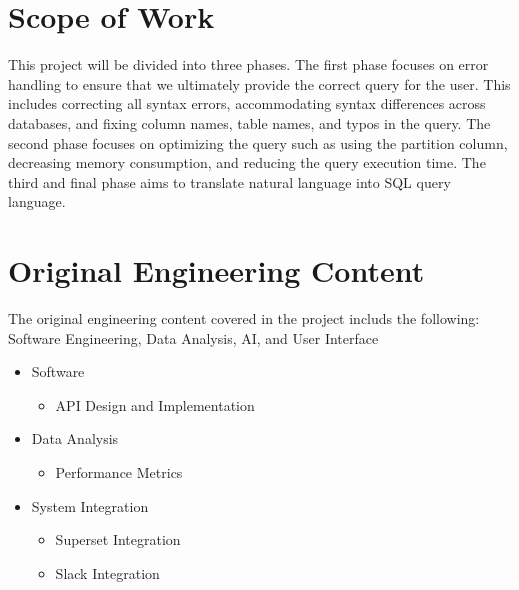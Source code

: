 \section{Scope of Work}
This project will be divided into three phases. The first phase focuses on error handling to ensure that we ultimately provide the correct query for the user. This includes correcting all syntax errors, accommodating syntax differences across databases, and fixing column names, table names, and typos in the query. The second phase focuses on optimizing the query such as using the partition column, decreasing memory consumption, and reducing the query execution time. The third and final phase aims to translate natural language into SQL query language.

\section{Original Engineering Content}
The original engineering content covered in the project includs the following: Software Engineering, Data Analysis, AI, and User Interface 
    \begin{itemize}
        \item  Software
        \begin{itemize}
            \item API Design and Implementation
        \end{itemize}
        \item  Data Analysis
        \begin{itemize}
            \item Performance Metrics
        \end{itemize}
        \item  System Integration
        \begin{itemize}
            \item Superset Integration
            \item Slack Integration
        \end{itemize}
    \end{itemize}

\pagebreak
